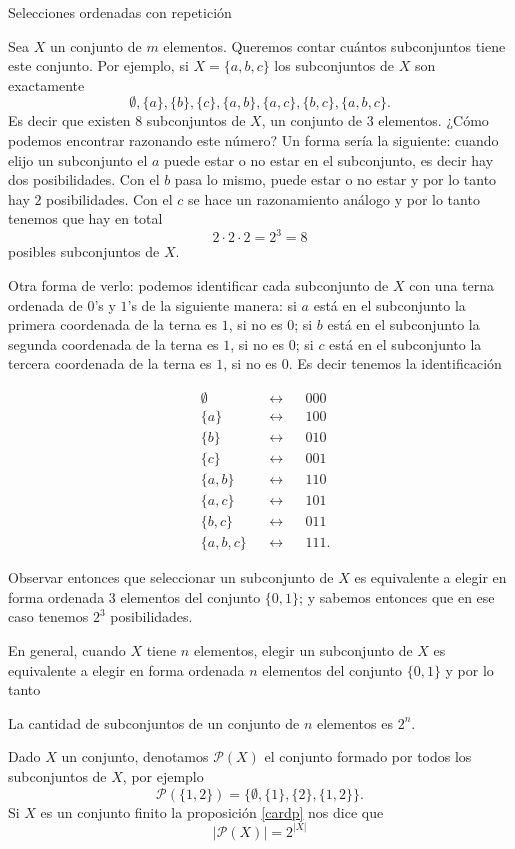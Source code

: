 \begin{section}{Selecciones ordenadas con repetición}
\begin{ejemplo*} Sea $X$ un conjunto de $m$ elementos. Queremos contar cuántos subconjuntos tiene este conjunto. 
Por ejemplo, si $X = \{ a, b, c \}$ los subconjuntos de $X$ son exactamente
$$
\emptyset, \{ a \} , \{ b \}, \{ c \}, \{ a, b \}, \{ a, c \}, \{ b, c \}, \{ a, b, c\}.
$$ 
Es decir que existen $8$ subconjuntos de $X$, un conjunto de $3$ elementos. ¿Cómo podemos encontrar razonando este número? Un forma sería la siguiente:  cuando elijo un subconjunto el $a$ puede estar o no estar en el subconjunto, es decir hay dos posibilidades. Con el $b$ pasa lo mismo, puede estar o no estar y por lo tanto hay $2$ posibilidades. Con el $c$ se hace un razonamiento análogo y por lo tanto tenemos que hay en total 
$$
2 \cdot 2 \cdot 2 = 2^3 = 8
$$
posibles subconjuntos de $X$.  

Otra forma de verlo: podemos identificar  cada subconjunto de  $X$ con una terna ordenada de $0$'s y $1$'s de la siguiente manera: si $a$ está en el subconjunto la primera coordenada de la terna es $1$, si no es $0$;  si $b$ está en el subconjunto la segunda coordenada de la terna es $1$, si no es $0$;  si $c$ está en el subconjunto la tercera coordenada de la terna es $1$, si no es $0$. Es decir tenemos la identificación



\begin{align*}
&\emptyset& &\leftrightarrow& &000 \\ 
&\{ a \} & &\leftrightarrow& &100 \\ 
&\{ b \}& &\leftrightarrow& &010 \\ 
&\{ c \}& &\leftrightarrow& &001 \\ 
&\{ a, b \}& &\leftrightarrow& &110 \\ 
&\{ a, c \}& &\leftrightarrow& &101 \\ 
&\{ b, c \}& &\leftrightarrow& &011 \\ 
&\{ a, b, c\}& &\leftrightarrow& &111 .
\end{align*}
 
Observar entonces que seleccionar un subconjunto de $X$ es equivalente a elegir en forma ordenada $3$ elementos del conjunto $\{ 0, 1 \}$; y sabemos entonces que en ese caso tenemos $2^3$ posibilidades. 

En general, cuando $X$ tiene $n$ elementos, 
elegir un subconjunto de $X$ es  equivalente a elegir en forma 
ordenada $n$ elementos del conjunto $\{ 0, 1 \}$ y por lo tanto

\begin{proposicion}\label{cardp} La cantidad de subconjuntos de  
un conjunto de $n$ elementos es $2^n$.
\end{proposicion}

Dado  $X$ un conjunto, denotamos $\mathcal P(X)$ el  conjunto  formado por todos los subconjuntos de $X$, por ejemplo
$$
\mathcal P(\{1,2\}) = \{\emptyset,\{1\},\{2\},\{1,2\}\}.
$$  
Si $X$ es un conjunto finito la proposición \ref{cardp} nos dice que
$$
\mathcal |\mathcal P(X)| = 2^{|X|}
$$
\end{ejemplo*}

\end{section}

